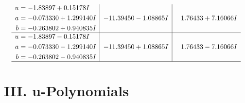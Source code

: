\documentclass[1p]{elsarticle_modified}
\theoremstyle{definition}
\begin{document}
$$\begin{array}{c|c|c}
\begin{aligned}
u &= -1.83897 + 0.15178 I \\
a &= -0.073330 + 1.299140 I \\
b &= -0.263802 + 0.940835 I\end{aligned}
 & -11.39450 - 1.08865 I & \phantom{-}1.76433 + 7.16066 I \\ \hline\begin{aligned}
u &= -1.83897 - 0.15178 I \\
a &= -0.073330 - 1.299140 I \\
b &= -0.263802 - 0.940835 I\end{aligned}
 & -11.39450 + 1.08865 I & \phantom{-}1.76433 - 7.16066 I\\
 \hline 
 \end{array}$$\newpage
\newpage\renewcommand{\arraystretch}{1}
\centering \section*{ III. u-Polynomials}
\end{document}
